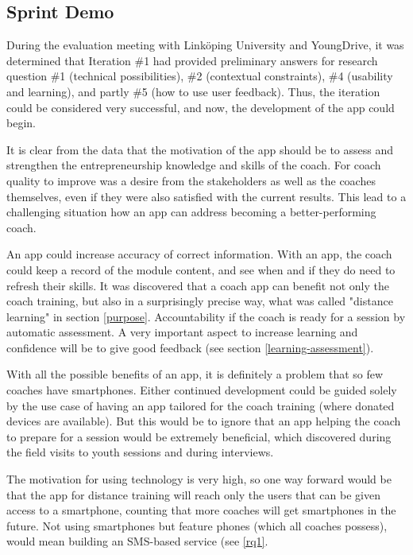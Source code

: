 \subsection{Sprint Demo}

During the evaluation meeting with Linköping University and YoungDrive, it was determined that Iteration \#1 had provided preliminary answers for research question \#1 (technical possibilities), \#2 (contextual constraints), \#4 (usability and learning), and partly \#5 (how to use user feedback). Thus, the iteration could be considered very successful, and now, the development of the app could begin.

It is clear from the data that the motivation of the app should be to assess and strengthen the entrepreneurship knowledge and skills of the coach. For coach quality to improve was a desire from the stakeholders as well as the coaches themselves, even if they were also satisfied with the current results. This lead to a challenging situation how an app can address becoming a better-performing coach.

An app could increase accuracy of correct information. With an app, the coach could keep a record of the module content, and see when and if they do need to refresh their skills. It was discovered that a coach app can benefit not only the coach training, but also in a surprisingly precise way, what was called "distance learning" in section \ref{purpose}. Accountability if the coach is ready for a session by automatic assessment. A very important aspect to increase learning and confidence will be to give good feedback (see section \ref{learning-assessment}).

With all the possible benefits of an app, it is definitely a problem that so few coaches have smartphones. Either continued development could be guided solely by the use case of having an app tailored for the coach training (where donated devices are available). But this would be to ignore that an app helping the coach to prepare for a session would be extremely beneficial, which discovered during the field visits to youth sessions and during interviews.

The motivation for using technology is very high, so one way forward would be that the app for distance training will reach only the users that can be given access to a smartphone, counting that more coaches will get smartphones in the future. Not using smartphones but feature phones (which all coaches possess), would mean building an SMS-based service (see \ref{rq1}.

